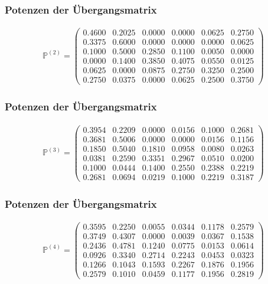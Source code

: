 \documentclass{beamer}
\begin{document}
\begin{frame}
	\frametitle{Potenzen der Übergangsmatrix}
	\begin{center}
		\begin{align*}
			\mathbb{P} ^{(2)} =
			\begin{pmatrix}
				0.4600 & 0.2025 & 0.0000 & 0.0000 & 0.0625 & 0.2750 \\
				0.3375 & 0.6000 & 0.0000 & 0.0000 & 0.0000 & 0.0625 \\
				0.1000 & 0.5000 & 0.2850 & 0.1100 & 0.0050 & 0.0000 \\
				0.0000 & 0.1400 & 0.3850 & 0.4075 & 0.0550 & 0.0125 \\
				0.0625 & 0.0000 & 0.0875 & 0.2750 & 0.3250 & 0.2500 \\
				0.2750 & 0.0375 & 0.0000 & 0.0625 & 0.2500 & 0.3750
			\end{pmatrix}
		\end{align*}
	\end{center}
\end{frame}

\begin{frame}
	\frametitle{Potenzen der Übergangsmatrix}
	\begin{center}
		\begin{align*}
			\mathbb{P} ^{(3)} =
			\begin{pmatrix}
				0.3954 & 0.2209 & 0.0000 & 0.0156 & 0.1000 & 0.2681 \\
				0.3681 & 0.5006 & 0.0000 & 0.0000 & 0.0156 & 0.1156 \\
				0.1850 & 0.5040 & 0.1810 & 0.0958 & 0.0080 & 0.0263 \\
				0.0381 & 0.2590 & 0.3351 & 0.2967 & 0.0510 & 0.0200 \\
				0.1000 & 0.0444 & 0.1400 & 0.2550 & 0.2388 & 0.2219 \\
				0.2681 & 0.0694 & 0.0219 & 0.1000 & 0.2219 & 0.3187
			\end{pmatrix}
		\end{align*}
	\end{center}
\end{frame}

\begin{frame}
	\frametitle{Potenzen der Übergangsmatrix}
	\begin{center}
		\begin{align*}
			\mathbb{P} ^{(4)} =
			\begin{pmatrix}
				0.3595 & 0.2250 & 0.0055 & 0.0344 & 0.1178 & 0.2579 \\
				0.3749 & 0.4307 & 0.0000 & 0.0039 & 0.0367 & 0.1538 \\
				0.2436 & 0.4781 & 0.1240 & 0.0775 & 0.0153 & 0.0614 \\
				0.0926 & 0.3340 & 0.2714 & 0.2243 & 0.0453 & 0.0323 \\
				0.1266 & 0.1043 & 0.1593 & 0.2267 & 0.1876 & 0.1956 \\
				0.2579 & 0.1010 & 0.0459 & 0.1177 & 0.1956 & 0.2819
			\end{pmatrix}
		\end{align*}
	\end{center}
\end{frame}
\end{document}
